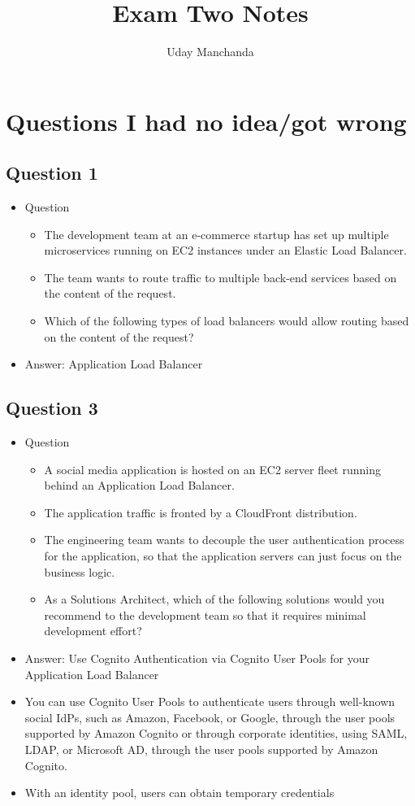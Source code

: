 \documentclass[]{scrartcl}
\title{Exam Two Notes}
\author{Uday Manchanda}
\begin{document}
\maketitle

\section{Questions I had no idea/got wrong}

\subsection{Question 1}
\begin{itemize}
	\item Question
	\begin{itemize}
		\item The development team at an e-commerce startup has set up multiple microservices running on EC2 instances under an Elastic Load Balancer. 
		\item The team wants to route traffic to multiple back-end services based on the content of the request.
		\item Which of the following types of load balancers would allow routing based on the content of the request?
	\end{itemize}
	\item Answer: Application Load Balancer
\end{itemize}

\subsection{Question 3}
\begin{itemize}
	\item Question
	\begin{itemize}
		\item A social media application is hosted on an EC2 server fleet running behind an Application Load Balancer. 
		\item The application traffic is fronted by a CloudFront distribution. 
		\item The engineering team wants to decouple the user authentication process for the application, so that the application servers can just focus on the business logic.
		\item As a Solutions Architect, which of the following solutions would you recommend to the development team so that it requires minimal development effort?
	\end{itemize}
	\item Answer: Use Cognito Authentication via Cognito User Pools for your Application Load Balancer
	\item You can use Cognito User Pools to authenticate users through well-known social IdPs, such as Amazon, Facebook, or Google, through the user pools supported by Amazon Cognito or through corporate identities, using SAML, LDAP, or Microsoft AD, through the user pools supported by Amazon Cognito.
	\item With an identity pool, users can obtain temporary credentials
\end{itemize}
\end{document}

